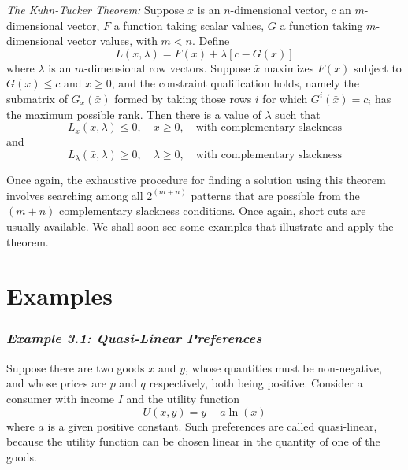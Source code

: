 \textit{The Kuhn-Tucker Theorem:} Suppose $x$ is an $n$-dimensional vector, $c$ an $m$-dimensional vector, $F$ a function taking scalar values, $G$ a function taking $m$-dimensional vector values, with $m<n$. Define
\begin{equation*} \tag{3.4}
L(x, \lambda) = F(x) + \lambda[c-G(x)]
\end{equation*}
where $\lambda$ is an $m$-dimensional row vectors. Suppose $\bar{x}$ maximizes $F(x)$ subject to $G(x) \leq c$ and $x \geq 0$, and the constraint qualification holds, namely the submatrix of $G_x(\bar{x})$ formed by taking those rows $i$ for which $G^i(\bar{x})= c_i $ has the maximum possible rank. Then there is a value of $\lambda$ such that
\begin{equation*} \tag{3.7}
L_x(\bar{x}, \lambda) \leq 0, \quad \bar{x} \geq 0, \quad \mbox{with complementary slackness}
\end{equation*}
and
\begin{equation*} \tag{3.10}
L_\lambda(\bar{x}, \lambda) \geq 0, \quad \lambda \geq0, \quad \mbox{with complementary slackness}
\end{equation*}

Once again, the exhaustive procedure for finding a solution using this theorem involves searching among all $2^{(m+n)}$ patterns that are possible from the $(m+n)$ complementary slackness conditions. Once again, short cuts are usually available. We shall soon see some examples that illustrate and apply the theorem.

\section*{Examples}

\subsubsection*{\textit{Example 3.1: Quasi-Linear Preferences}}

Suppose there are two goods $x$ and $y$, whose quantities must be non-negative, and whose prices are $p$ and $q$ respectively, both being positive. Consider a consumer with income $I$ and the utility function
\begin{equation*}
U(x, y) = y + a \ln(x)
\end{equation*}
where $a$ is a given positive constant. Such preferences are called quasi-linear, because the utility function can be chosen linear in the quantity of one of the goods.

